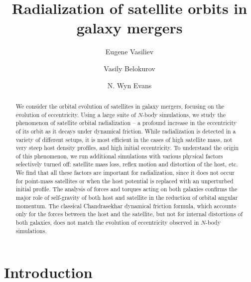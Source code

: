 \documentclass[twocolumn]{aastex63}
\begin{document}
\vspace*{-5mm}
\title{Radialization of satellite orbits in galaxy mergers}

\author{Eugene Vasiliev}
\author{Vasily Belokurov}
\author{N. Wyn Evans}

\begin{abstract}
We consider the orbital evolution of satellites in galaxy mergers, focusing on the evolution of eccentricity. Using a large suite of $N$-body simulations, we study the phenomenon of satellite orbital radialization -- a profound increase in the eccentricity of its orbit as it decays under dynamical friction. While radialization is detected in a variety of different setups, it is most efficient in the cases of high satellite mass, not very steep host density profiles, and high initial eccentricity. To understand the origin of this phenomenon, we run additional simulations with various physical factors selectively turned off: satellite mass loss, reflex motion and distortion of the host, etc. We find that all these factors are important for radialization, since it does not occur for point-mass satellites or when the host potential is replaced with an unperturbed initial profile. The analysis of forces and torques acting on both galaxies confirms the major role of self-gravity of both host and satellite in the reduction of orbital angular momentum. The classical Chandrasekhar dynamical friction formula, which accounts only for the forces between the host and the satellite, but not for internal distortions of both galaxies, does not match the evolution of eccentricity observed in $N$-body simulations.
\vspace*{8mm}
\end{abstract}

\section{Introduction}
\end{document}
